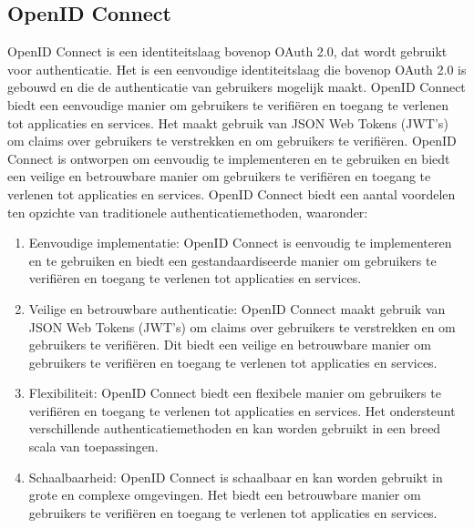   \subsection{OpenID Connect}%
  \label{subsec:openid-connect}
  OpenID Connect is een identiteitslaag bovenop OAuth 2.0, dat wordt gebruikt voor authenticatie. Het is een eenvoudige identiteitslaag die bovenop OAuth 2.0 is gebouwd en die de authenticatie van gebruikers mogelijk maakt. OpenID Connect biedt een eenvoudige manier om gebruikers te verifiëren en toegang te verlenen tot applicaties en services. Het maakt gebruik van JSON Web Tokens (JWT's) om claims over gebruikers te verstrekken en om gebruikers te verifiëren. OpenID Connect is ontworpen om eenvoudig te implementeren en te gebruiken en biedt een veilige en betrouwbare manier om gebruikers te verifiëren en toegang te verlenen tot applicaties en services.
  \newline
  \newline
  OpenID Connect biedt een aantal voordelen ten opzichte van traditionele authenticatiemethoden, waaronder:
  \begin{enumerate}[label=\textbf{-}]
      \item Eenvoudige implementatie: OpenID Connect is eenvoudig te implementeren en te gebruiken en biedt een gestandaardiseerde manier om gebruikers te verifiëren en toegang te verlenen tot applicaties en services.
      \item Veilige en betrouwbare authenticatie: OpenID Connect maakt gebruik van JSON Web Tokens (JWT's) om claims over gebruikers te verstrekken en om gebruikers te verifiëren. Dit biedt een veilige en betrouwbare manier om gebruikers te verifiëren en toegang te verlenen tot applicaties en services.
      \item Flexibiliteit: OpenID Connect biedt een flexibele manier om gebruikers te verifiëren en toegang te verlenen tot applicaties en services. Het ondersteunt verschillende authenticatiemethoden en kan worden gebruikt in een breed scala van toepassingen.
      \item Schaalbaarheid: OpenID Connect is schaalbaar en kan worden gebruikt in grote en complexe omgevingen. Het biedt een betrouwbare manier om gebruikers te verifiëren en toegang te verlenen tot applicaties en services.
  \end{enumerate}
  \autocite{Sakimura2014}


